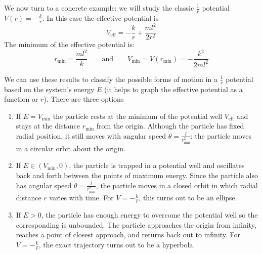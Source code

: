 \documentclass[11pt, a4paper]{article}
\newcommand{\eqtext}[1]{\qquad \text{#1} \qquad}
\newcommand{\veff}{V_{\text{eff}}}  %
\begin{document}
We now turn to a concrete example: we will study the classic $ \frac{1}{r} $ potential $ V(r) = -\frac{k}{r} $. In this case the effective potential is
\begin{equation*}
	\veff = -\frac{k}{r} + \frac{ml^{2}}{2r^{2}}
\end{equation*}
The minimum of the effective potential is:
\begin{equation*}
	r_{\text{min}} = \frac{ml^{2}}{k} \eqtext{and} V_{\text{min}} = V(r_{\text{min}}) = -\frac{k^{2}}{2ml^{2}}
\end{equation*}

We can use these results to classify the possible forms of motion in a $ \frac{1}{r} $ potential based on the system's energy $ E $ (it helps to graph the effective potential as a function or $ r $). There are three options
\begin{enumerate}
	\item If $ E = V_{\text{min}} $ the particle rests at the minimum of the potential well $ \veff $ and stays at the distance $ r_{\text{min}} $ from the origin. Although the particle has fixed radial position, it still moves with angular speed $ \dot{\theta} = \frac{l}{r_{\text{min}}^{2}} $: the particle moves in a circular orbit about the origin.
	
	\item If $ E \in (V_{\text{min}}, 0) $, the particle is trapped in a potential well and oscillates back and forth between the points of maximum energy. Since the particle also has angular speed $ \dot{\theta} = \frac{l}{r_{\text{min}}^{2}} $, the particle moves in a closed orbit in which radial distance $ r $ varies with time. For $ V = - \frac{k}{r} $, this turns out to be an ellipse.
	
	\item If $ E > 0 $, the particle has enough energy to overcome the potential well so the corresponding is unbounded. The particle approaches the origin from infinity, reaches a point of closest approach, and returns back out to infinity. For $ V = - \frac{k}{r} $, the exact trajectory turns out to be a hyperbola.
\end{enumerate}
\end{document}
